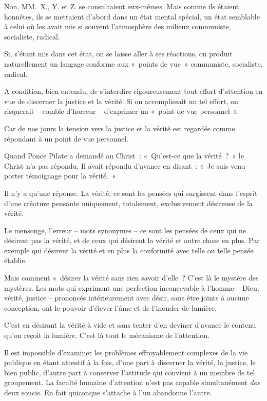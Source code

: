 \documentclass[french,twoside]{book} %
\begin{document}
Non, MM. X., Y. et Z. se consultaient eux-mêmes. Mais comme ils étaient honnêtes, ils se mettaient d’abord dans un état mental spécial, un état semblable à celui où les avait mis si souvent l’atmosphère des milieux communiste, socialiste, radical.\par
Si, s’étant mis dans cet état, on se laisse aller à ses réactions, on produit naturellement un langage conforme aux « points de vue » communiste, socialiste, radical.\par
A condition, bien entendu, de s’interdire rigoureusement tout effort d’attention en vue de discerner la justice et la vérité. Si on accomplissait un tel effort, on risquerait – comble d’horreur – d’exprimer un « point de vue personnel ».\par
Car de nos jours la tension vers la justice et la vérité est regardée comme répondant à un point de vue personnel.\par
Quand Ponce Pilate a demandé au Christ : « Qu’est-ce que la vérité ? » le Christ n’a pas répondu. Il avait répondu d’avance en disant : « Je suis venu porter témoignage pour la vérité. »\par
Il n’y a qu’une réponse. La vérité, ce sont les pensées qui surgissent dans l’esprit d’une créature pensante uniquement, totalement, exclusivement désireuse de la vérité.\par
Le mensonge, l’erreur – mots synonymes – ce sont les pensées de ceux qui ne désirent pas la vérité, et de ceux qui désirent la vérité et autre chose en plus. Par exemple qui désirent la vérité et en plus la conformité avec telle ou telle pensée établie.\par
Mais comment « désirer la vérité sans rien savoir d’elle ? C’est là le mystère des mystères. Les mots qui expriment une perfection inconcevable à l’homme – Dieu, vérité, justice – prononcés intérieurement avec désir, sans être joints à aucune conception, ont le pouvoir d’élever l’âme et de l’inonder de lumière.\par
C’est en désirant la vérité à vide et sans tenter d’en deviner d’avance le contenu qu’on reçoit la lumière. C’est là tout le mécanisme de l’attention.\par
Il est impossible d’examiner les problèmes effroyablement complexes de la vie publique en étant attentif à la fois, d’une part à discerner la vérité, la justice, le bien public, d’autre part à conserver l’attitude qui convient à un membre de tel groupement. La faculté humaine d’attention n’est pas capable simultanément \emph{des} deux soucis. En fait quiconque s’attache à l’un abandonne l’autre.\par
\end{document}
